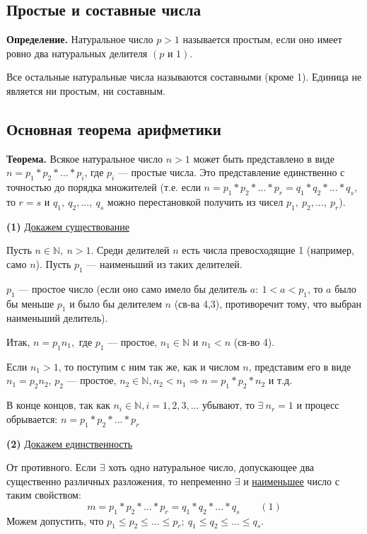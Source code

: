 \documentclass{article}
\begin{document}
  	    \subsection{Простые и составные числа}
        	\textbf{Определение.} Натуральное число \( p > 1 \) называется простым, если оно имеет ровно два натуральных делителя \( (p \textrm{ и } 1) \).

  			Все остальные натуральные числа называются составными (кроме 1). Единица не является ни простым, ни составным.
            
        \subsection{Основная теорема арифметики}
        	\textbf{Теорема.} Всякое натуральное число \( n > 1 \) может быть представлено в виде \( n = p_1*p_2* ... *p_i \), где \( p_i \) --- простые числа. Это представление единственно с точностью до порядка множителей (т.е. если \( n = p_1*p_2*...*p_r = q_1*q_2*...*q_s \), то \( r = s \) и \(q_1,\ q_2,...,\ q_s \) можно перестановкой получить из чисел \( p_1,\ p_2,...,\ p_r \)).

            \textbf{(1)} \underline{Докажем существование} 

            Пусть \(n \in \mathbb{N},\ n > 1 \). Среди делителей \( n \) есть числа превосходящие 1 (например, само \( n \)). Пусть \( p_1 \) --- наименьший из таких делителей.

            \( p_1 \) --- простое число (если оно само имело бы делитель \(a:\ 1 < a < p_1 \), то \( a \) было бы меньше \( p_1 \) и было бы делителем \( n \) (св-ва 4,3), противоречит тому, что выбран наименьший делитель).

            Итак, \( n = p_1n_1, \textrm{ где } p_1 \textrm{ --- простое, } n_1 \in \mathbb{N} \textrm{ и } n_1 < n \) (св-во 4).

            Если \( n_1 > 1 \), то поступим с ним так же, как и числом \( n \), представим его в виде \( n_1 = p_2n_2 \), \( p_2 \) --- простое, \( n_2 \in \mathbb{N}, n_2 < n_1 \Rightarrow n = p_1*p_2*n_2 \) и т.д.

            В конце концов, так как \( n_i \in \mathbb{N}, i=1,2,3,... \) убывают, то \( \exists\ n_r = 1 \) и процесс обрывается: \( n=p_1*p_2*...*p_r \)

            \textbf{(2)} \underline{Докажем единственность}
            
            От противного. Если \( \exists \) хоть одно натуральное число, допускающее два существенно различных разложения, то непременно \( \exists \) и \underline{наименьшее} число с таким свойством: \[ m = p_1*p_2*...*p_r = q_1*q_2*...*q_s \qquad (1) \]
            Можем допустить, что \( p_1 \leq p_2 \leq ... \leq p_r;\ q_1 \leq q_2 \leq ... \leq q_s \).
\end{document}

